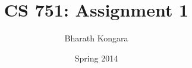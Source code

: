 \documentclass[letterpaper]{report}
\begin{document}
\renewcommand{\thesection}{\arabic{section}}

\author{Bharath Kongara	}
\title{CS 751: Assignment 1}

\date{Spring 2014}

\maketitle

\tableofcontents
\newpage









\nocite{*}
\end{document}
